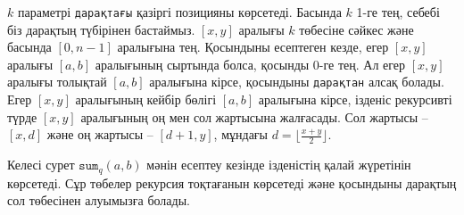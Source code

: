 $k$ параметрі \texttt{дарақтағы} қазіргі позицияны көрсетеді. 
Басында $k$ 1-ге тең, себебі біз дарақтың түбірінен бастаймыз.
$[x,y]$ аралығы $k$ төбесіне сәйкес және басында $[0,n-1]$ аралығына тең.
Қосындыны есептеген кезде, егер $[x,y]$ аралығы $[a,b]$ аралығының сыртында 
болса, қосынды 0-ге тең. Ал егер $[x,y]$ аралығы толықтай $[a,b]$ аралығына 
кірсе, қосындыны \texttt{дарақтан} алсақ болады. Егер $[x,y]$ аралығының
кейбір бөлігі $[a,b]$ аралығына кірсе, ізденіс рекурсивті түрде 
$[x,y]$ аралығының оң мен сол жартысына жалғасады. Сол жартысы -- $[x,d]$
және оң жартысы -- $[d+1,y]$, мұндағы $d=\lfloor \frac{x+y}{2} \rfloor$. 


Келесі сурет  $\texttt{sum}_q(a,b)$ мәнін есептеу кезінде
ізденістің қалай жүретінін көрсетеді. Сұр төбелер рекурсия тоқтағанын 
көрсетеді және қосындыны дарақтың сол төбесінен алуымызға болады.


